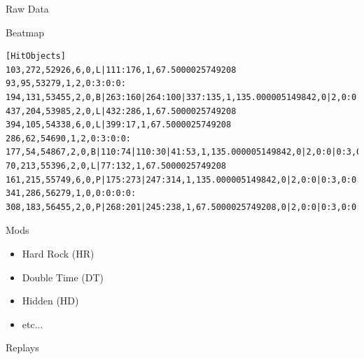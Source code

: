 \documentclass[table]{beamer}
\begin{document}
\begin{frame}[fragile, label=raw-data]{Raw Data}
  \begin{block}{Beatmap}
    \begin{verbatim}
[HitObjects]
103,272,52926,6,0,L|111:176,1,67.5000025749208
93,95,53279,1,2,0:3:0:0:
194,131,53455,2,0,B|263:160|264:100|337:135,1,135.000005149842,0|2,0:0|0:3,0:0:0:0:
437,204,53985,2,0,L|432:286,1,67.5000025749208
394,105,54338,6,0,L|399:17,1,67.5000025749208
286,62,54690,1,2,0:3:0:0:
177,54,54867,2,0,B|110:74|110:30|41:53,1,135.000005149842,0|2,0:0|0:3,0:0:0:0:
70,213,55396,2,0,L|77:132,1,67.5000025749208
161,215,55749,6,0,P|175:273|247:314,1,135.000005149842,0|2,0:0|0:3,0:0:0:0:
341,286,56279,1,0,0:0:0:0:
308,183,56455,2,0,P|268:201|245:238,1,67.5000025749208,0|2,0:0|0:3,0:0:0:0:
    \end{verbatim}
  \end{block}
\end{frame}

\begin{frame}{Mods}
  \begin{itemize}
  \item<1-> Hard Rock (HR)
  \item<2-> Double Time (DT)
  \item<3-> Hidden (HD)
  \item<4-> etc...
  \end{itemize}
\end{frame}

\begin{frame}{Replays}

\end{frame}
\end{document}
